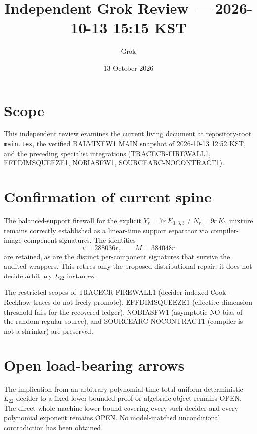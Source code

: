 \documentclass[11pt]{article}
\title{Independent Grok Review --- 2026-10-13 15:15 KST}
\author{Grok}
\date{13 October 2026}
\begin{document}
\maketitle

\begin{center}
\end{center}

\section{Scope}
This independent review examines the current living document at repository-root \texttt{main.tex}, the verified BALMIXFW1 MAIN snapshot of 2026-10-13 12:52 KST, and the preceding specialist integrations (TRACECR-FIREWALL1, EFFDIMSQUEEZE1, NOBIASFW1, SOURCEARC-NOCONTRACT1).

\section{Confirmation of current spine}
The balanced-support firewall for the explicit \(Y_r = 7r\,K_{3,3,3}\) / \(N_r = 9r\,K_7\) mixture remains correctly established as a linear-time support separator via compiler-image component signatures. The identities
\[
v = 288036r,\qquad M = 384048r
\]
are retained, as are the distinct per-component signatures that survive the audited wrappers. This retires only the proposed distributional repair; it does not decide arbitrary \(L_{22}\) instances.

The restricted scopes of TRACECR-FIREWALL1 (decider-indexed Cook--Reckhow traces do not freely promote), EFFDIMSQUEEZE1 (effective-dimension threshold fails for the recovered ledger), NOBIASFW1 (asymptotic NO-bias of the random-regular source), and SOURCEARC-NOCONTRACT1 (compiler is not a shrinker) are preserved.

\section{Open load-bearing arrows}
The implication from an arbitrary polynomial-time total uniform deterministic \(L_{22}\) decider to a fixed lower-bounded proof or algebraic object remains OPEN. The direct whole-machine lower bound covering every such decider and every polynomial exponent remains OPEN. No model-matched unconditional contradiction has been obtained.
\end{document}
